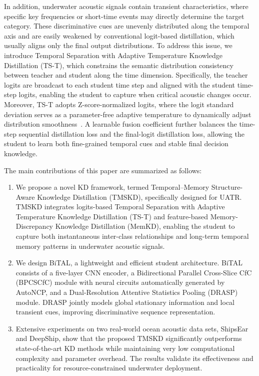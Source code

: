 ﻿\documentclass[lettersize,journal]{IEEEtran}
\begin{document}
In addition, underwater acoustic signals contain transient characteristics, where specific key frequencies or short-time events may directly determine the target category. These discriminative cues are unevenly distributed along the temporal axis and are easily weakened by conventional logit-based distillation, which usually aligns only the final output distributions. To address this issue, we introduce Temporal Separation with Adaptive Temperature Knowledge Distillation (TS-T), which constrains the semantic distribution consistency between teacher and student along the time dimension. Specifically, the teacher logits are broadcast to each student time step and aligned with the student time-step logits, enabling the student to capture when critical acoustic changes occur. Moreover, TS-T adopts Z-score-normalized logits, where the logit standard deviation serves as a parameter-free adaptive temperature to dynamically adjust distribution smoothness~\cite{Sun2024LSKD}. A learnable fusion coefficient further balances the time-step sequential distillation loss and the final-logit distillation loss, allowing the student to learn both fine-grained temporal cues and stable final decision knowledge.

The main contributions of this paper are summarized as follows:
\begin{enumerate}
    \item We propose a novel KD framework, termed Temporal--Memory Structure-Aware Knowledge Distillation (TMSKD), specifically designed for UATR. TMSKD integrates logits-based Temporal Separation with Adaptive Temperature Knowledge Distillation (TS-T) and feature-based Memory-Discrepancy Knowledge Distillation (MemKD), enabling the student to capture both instantaneous inter-class relationships and long-term temporal memory patterns in underwater acoustic signals.
    \item We design BiTAL, a lightweight and efficient student architecture. BiTAL consists of a five-layer CNN encoder, a Bidirectional Parallel Cross-Slice CfC (BPCSCfC) module with neural circuits automatically generated by AutoNCP, and a Dual-Resolution Attentive Statistics Pooling (DRASP) module. DRASP jointly models global stationary information and local transient cues, improving discriminative sequence representation.
    \item Extensive experiments on two real-world ocean acoustic data sets, ShipsEar and DeepShip, show that the proposed TMSKD significantly outperforms state-of-the-art KD methods while maintaining very low computational complexity and parameter overhead. The results validate its effectiveness and practicality for resource-constrained underwater deployment.
\end{enumerate}
\end{document}
